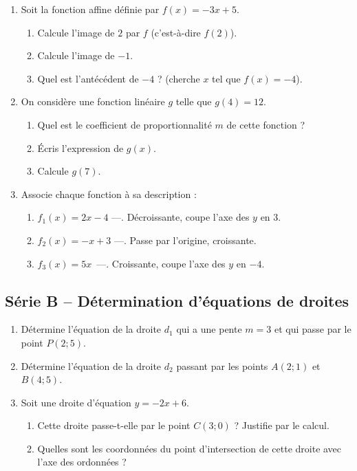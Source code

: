 \documentclass[../main.tex]{subfiles}
\begin{document}
\begin{enumerate}[label=\textbf{\arabic*.}]

\item Soit la fonction affine définie par $f(x) = -3x + 5$.
\begin{enumerate}[label=\alph*)]
  \item Calcule l'image de $2$ par $f$ (c'est-à-dire $f(2)$).
  \item Calcule l'image de $-1$.
  \item Quel est l'antécédent de $-4$ ? (cherche $x$ tel que $f(x) = -4$).
\end{enumerate}

\item On considère une fonction linéaire $g$ telle que $g(4) = 12$.
\begin{enumerate}[label=\alph*)]
  \item Quel est le coefficient de proportionnalité $m$ de cette fonction ?
  \item Écris l'expression de $g(x)$.
  \item Calcule $g(7)$.
\end{enumerate}

\item Associe chaque fonction à sa description :
\begin{enumerate}[label=\alph*),itemsep=1pt]
  \item $f_1(x) = 2x - 4$ \quad---. Décroissante, coupe l'axe des $y$ en $3$.
  \item $f_2(x) = -x + 3$ \quad---. Passe par l'origine, croissante.
  \item $f_3(x) = 5x$ \quad\quad\quad\,---. Croissante, coupe l'axe des $y$ en $-4$.
\end{enumerate}

\end{enumerate}

\subsection{Série B -- Détermination d'équations de droites}

\begin{enumerate}[label=\textbf{\arabic*.},start=4]

\item Détermine l'équation de la droite $d_1$ qui a une pente $m = 3$ et qui passe par le point $P(2; 5)$.

\item Détermine l'équation de la droite $d_2$ passant par les points $A(2; 1)$ et $B(4; 5)$.

\item Soit une droite d'équation $y = -2x + 6$.
\begin{enumerate}[label=\alph*)]
  \item Cette droite passe-t-elle par le point $C(3; 0)$ ? Justifie par le calcul.
  \item Quelles sont les coordonnées du point d'intersection de cette droite avec l'axe des ordonnées ?
\end{enumerate}

\end{enumerate}
\end{document}
